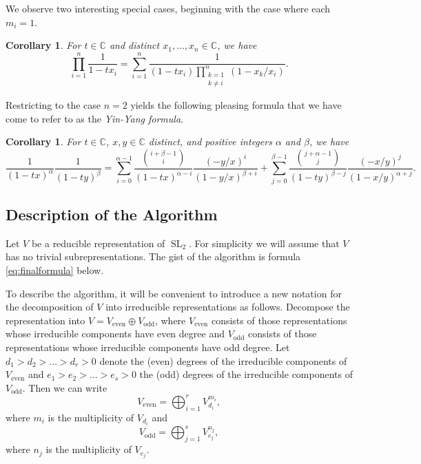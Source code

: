 \documentclass{amsart}
\newtheorem{corollary}[theorem]{Corollary}
\theoremstyle{definition}
\theoremstyle{remark}
\newcommand{\C}{\mathbb{C}}
\begin{document}
We observe two interesting special cases, beginning with the case where each $m_i = 1$.

\begin{corollary}
\label{cor:PartFracMi1}
For $t\in\C$ and distinct $x_1, \ldots, x_n\in\C$, we have
\[
    \prod\limits_{i=1}^n \frac{1}{1 - t x_i}
    =
    \sum\limits_{i=1}^n \frac{1}{(1 - t x_i)
        \prod\limits_{\substack{k=1 \\ k\neq i}}^n (1 - x_k/x_i)}.
\]
\end{corollary}

Restricting to the case $n = 2$ yields the following pleasing formula that we have come to
refer to as the \emph{Yin-Yang formula}.

\begin{corollary}
\label{cor:PartFracYinYang}
For $t\in\C$, $x, y \in \C$ distinct, and positive integers $\alpha$ and $\beta$, we have
\begin{equation*}
    \frac{1}{(1 - tx)^\alpha} \frac{1}{(1 - ty)^\beta}
    =
    \sum\limits_{i=0}^{\alpha-1} \frac{ \binom{i + \beta - 1}{i} }{(1 - t x)^{\alpha - i}}
        \frac{(-y/x)^i }{(1 - y/x)^{\beta + i}}
    +
    \sum\limits_{j=0}^{\beta-1} \frac{ \binom{j + \alpha - 1}{j} }{(1 - t y)^{\beta - j}}
        \frac{(-x/y)^j }{(1 - x/y)^{\alpha + j}}.
\end{equation*}
\end{corollary}


\subsection{Description of the Algorithm}
\label{subsec:DirtyMethod}

Let $V$ be a reducible representation of $\operatorname{SL}_2$. For simplicity we will assume that $V$ has
no trivial subrepresentations. The gist of the algorithm is formula \eqref{eq:finalformula} below.

To describe the algorithm, it will be convenient to introduce a new notation
for the decomposition of $V$ into irreducible representations as follows. Decompose the representation into
$V=V_{\operatorname{even}}\oplus V_{\operatorname{odd}}$, where $V_{\operatorname{even}}$
consists of those representations whose irreducible components have even degree and
$V_{\operatorname{odd}}$ consists of those representations whose irreducible components have odd degree.
Let $d_1>d_2>\ldots> d_r>0$ denote the (even) degrees of the irreducible components of $V_{\operatorname{even}}$
and $e_1>e_2>\ldots>e_s>0$ the (odd) degrees of the irreducible components of $V_{\operatorname{odd}}$.
Then we can write
\[
    V_{\operatorname{even}}=\bigoplus_{i=1}^r V_{d_i}^{m_i},
\]
where $m_i$ is the multiplicity of $V_{d_i}$ and
\[
    V_{\operatorname{odd}}=\bigoplus_{j=1}^s V_{e_j}^{n_j},
\]
where $n_j$ is the multiplicity of $V_{e_j}$.
\end{document}
